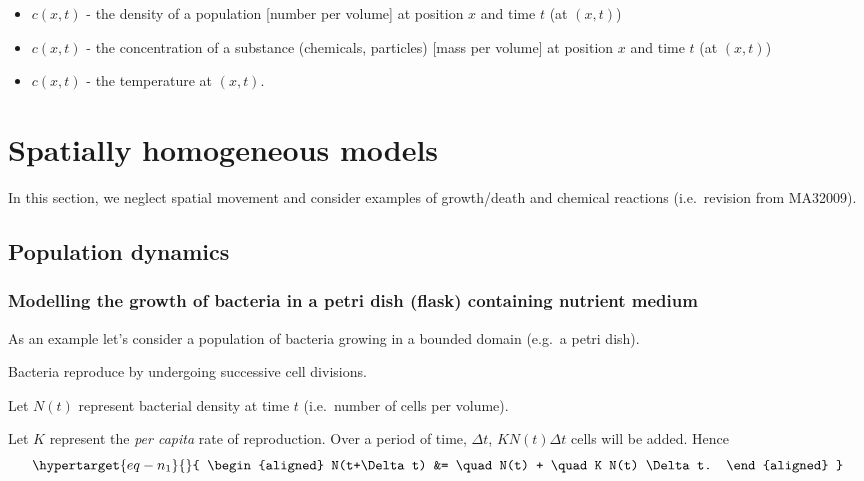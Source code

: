 \documentclass[
  letterpaper,
  DIV=11,
  numbers=noendperiod]{scrreprt}
\providecommand{\tightlist}{%
  \setlength{\itemsep}{0pt}\setlength{\parskip}{0pt}}\usepackage{longtable,booktabs,array}
\theoremstyle{plain}
\theoremstyle{definition}
\theoremstyle{plain}
\theoremstyle{remark}
\begin{document}
\begin{itemize}
\tightlist
\item
  \(c(x,t)\) - the density of a population {[}number per volume{]} at
  position \(x\) and time \(t\) (at \((x,t)\))
\item
  \(c(x,t)\) - the concentration of a substance (chemicals, particles)
  {[}mass per volume{]} at position \(x\) and time \(t\) (at \((x,t)\))
\item
  \(c(x,t)\) - the temperature at \((x,t)\).
\end{itemize}

\hypertarget{spatially-homogeneous-models}{%
\section{Spatially homogeneous
models}\label{spatially-homogeneous-models}}

In this section, we neglect spatial movement and consider examples of
growth/death and chemical reactions (i.e.~revision from MA32009).

\hypertarget{population-dynamics}{%
\subsection{Population dynamics}\label{population-dynamics}}

\hypertarget{modelling-the-growth-of-bacteria-in-a-petri-dish-flask-containing-nutrient-medium}{%
\subsubsection{Modelling the growth of bacteria in a petri dish (flask)
containing nutrient
medium}\label{modelling-the-growth-of-bacteria-in-a-petri-dish-flask-containing-nutrient-medium}}

As an example let's consider a population of bacteria growing in a
bounded domain (e.g.~a petri dish).

Bacteria reproduce by undergoing successive cell divisions.

Let \(N(t)\) represent bacterial density at time \(t\) (i.e.~number of
cells per volume).

Let \(K\) represent the \emph{per capita} rate of reproduction. Over a
period of time, \(\Delta t\), \(K N(t) \Delta t\) cells will be added.
Hence \begin{equation}\protect\hypertarget{eq-n_1}{}{ 
\begin{aligned}
N(t+\Delta t) &=  \quad N(t)   + \quad  K N(t) \Delta t.
\end{aligned}
}\label{eq-n_1}\end{equation}
\end{document}
